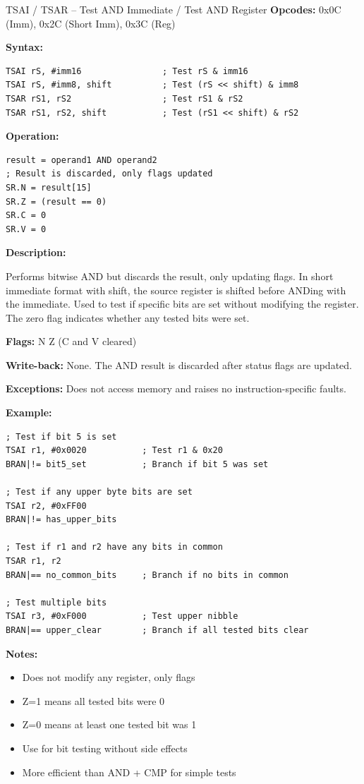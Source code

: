 \begin{instructionbox}{TSAI / TSAR -- Test AND Immediate / Test AND Register}
	\textbf{Opcodes:} 0x0C (Imm), 0x2C (Short Imm), 0x3C (Reg)

	\textbf{Syntax:}
	\begin{lstlisting}
TSAI rS, #imm16                ; Test rS & imm16
TSAI rS, #imm8, shift          ; Test (rS << shift) & imm8
TSAR rS1, rS2                  ; Test rS1 & rS2
TSAR rS1, rS2, shift           ; Test (rS1 << shift) & rS2
\end{lstlisting}

	\textbf{Operation:}
	\begin{verbatim}
result = operand1 AND operand2
; Result is discarded, only flags updated
SR.N = result[15]
SR.Z = (result == 0)
SR.C = 0
SR.V = 0
\end{verbatim}

	\textbf{Description:}

	Performs bitwise AND but discards the result, only updating flags. In short immediate format with shift, the source
	register is shifted before ANDing with the immediate. Used to test if specific bits are set without modifying the
	register. The zero flag indicates whether any tested bits were set.

	\textbf{Flags:} N Z (C and V cleared)

	\textbf{Write-back:} None. The AND result is discarded after status flags are updated.

	\textbf{Exceptions:} Does not access memory and raises no instruction-specific faults.

	\textbf{Example:}
	\begin{lstlisting}
; Test if bit 5 is set
TSAI r1, #0x0020           ; Test r1 & 0x20
BRAN|!= bit5_set           ; Branch if bit 5 was set

; Test if any upper byte bits are set
TSAI r2, #0xFF00
BRAN|!= has_upper_bits

; Test if r1 and r2 have any bits in common
TSAR r1, r2
BRAN|== no_common_bits     ; Branch if no bits in common

; Test multiple bits
TSAI r3, #0xF000           ; Test upper nibble
BRAN|== upper_clear        ; Branch if all tested bits clear
\end{lstlisting}

	\textbf{Notes:}
	\begin{itemize}
		\item Does not modify any register, only flags
		\item Z=1 means all tested bits were 0
		\item Z=0 means at least one tested bit was 1
		\item Use for bit testing without side effects
		\item More efficient than AND + CMP for simple tests
	\end{itemize}
\end{instructionbox}

